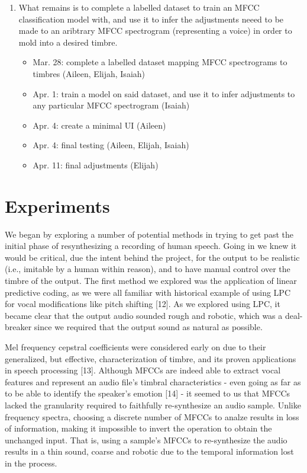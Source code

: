 \documentclass{article}
\begin{document}
\begin{enumerate}
\begin{itemize}
    \end{itemize}
  \item What remains is to complete a labelled dataset to train an MFCC classification model with, and use it to infer the adjustments neeed to be made to an aribtrary MFCC spectrogram (representing a voice) in order to mold into a desired timbre.
    \begin{itemize}
      \item Mar. 28: complete a labelled dataset mapping MFCC spectrograms to timbres (Aileen, Elijah, Isaiah)
      \item Apr. 1: train a model on said dataset, and use it to infer adjustments to any particular MFCC spectrogram (Isaiah)
      \item Apr. 4: create a minimal UI (Aileen)
      \item Apr. 4: final testing (Aileen, Elijah, Isaiah)
      \item Apr. 11: final adjustments (Elijah)
    \end{itemize}
\end{enumerate}

\section{Experiments}\label{sec:page_size}

We began by exploring a number of potential methods in trying to get past the initial phase of resynthesizing a recording of human speech. Going in we knew it would be critical, due the intent behind the project, for the output to be realistic (i.e., imitable by a human within reason), and to have manual control over the timbre of the output. The first method we explored was the application of linear predictive coding, as we were all familiar with historical example of using LPC for vocal modifications like pitch shifting [12]. As we explored using LPC, it became clear that the output audio sounded rough and robotic, which was a deal-breaker since we required that the output sound as natural as possible.

Mel frequency cepstral coefficients were considered early on due to their generalized, but effective, characterization of timbre, and its proven applications in speech processing [13]. Although MFCCs are indeed able to extract vocal features and represent an audio file's timbral characteristics - even going as far as to be able to identify the speaker's emotion [14] - it seemed to us that MFCCs lacked the granularity required to faithfully re-synthesize an audio sample. Unlike frequency spectra, choosing a discrete number of MFCCs to analze results in loss of information, making it impossible to invert the operation to obtain the unchanged input. That is, using a sample's MFCCs to re-synthesize the audio results in a thin sound, coarse and robotic due to the temporal information lost in the process.
\end{document}
